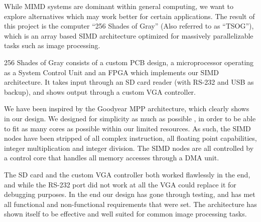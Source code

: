 While MIMD systems are dominant within general computing, we want to explore
alternatives which may work better for certain applications. The result of this
project is the computer ``256 Shades of Gray'' (Also referred to as
``TSOG''), which is
an array based SIMD architecture optimized for massively parallelizable tasks
such as image processing.

256 Shades of Gray consists of a custom PCB design, a microprocessor operating
as a System Control Unit and an FPGA which implements our SIMD architecture. It
takes input through an SD card reader (with RS-232 and USB as
backup), and shows output
through a custom VGA controller.

We have been inspired by the Goodyear MPP architecture, which clearly shows in
our design. We designed for simplicity as much as possible , in
order to be able to fit as many cores as possible within our limited
resources. As such, the SIMD nodes have been stripped of all complex
instruction, all floating point capabilities, integer multiplication and integer
division. The SIMD nodes are all controlled by a control core that handles all
memory accesses through a DMA unit.

The SD card and the custom VGA controller both worked flawlessly in the
end, and while the RS-232 port did not work at
all the VGA could replace it for debugging purposes. In the end our design has
gone through testing, and has met all functional and non-functional requirements
that were set. The architecture has shown itself to be effective and well suited
for common image processing tasks.
\endgroup
